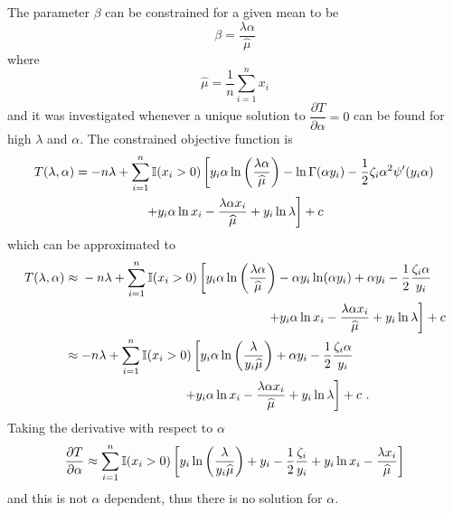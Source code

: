 The parameter $\beta$ can be constrained for a given mean to be
\begin{equation}
  \beta = \frac{\lambda\alpha}{\widehat{\mu}}
  \label{eq:compoundPoisson:beta_restrict}
\end{equation}
where
\begin{equation}
  \widehat{\mu} = \frac{1}{n}\sum_{i=1}^n x_i
\end{equation}
and it was investigated whenever a unique solution to $\dfrac{\partial T}{\partial \alpha} = 0$ can be found for high $\lambda$ and $\alpha$. The constrained objective function is
\begin{multline}
  T(\lambda,\alpha)
  =
  -n\lambda+
  \sum_{i=1}^n
  \mathbb{I}(x_i>0)
  \left[
  y_i\alpha
  \ln\left(\frac{\lambda\alpha}{\widehat{\mu}}\right)-\ln\Gamma(\alpha y_i) - \frac{1}{2}\zeta_i\alpha^2\psi'(y_i\alpha)
  \right.
  \\
  \left.
    +y_i\alpha\ln x_i - \frac{\lambda\alpha x_i}{\widehat{\mu}}
    + y_i \ln \lambda
    \vphantom{\frac{1}{1}}
  \right]
  + c
\end{multline}
which can be approximated to
\begin{align}
  T(\lambda,\alpha)&\approx
  \begin{multlined}[t]
    -n\lambda+
    \sum_{i=1}^n
    \mathbb{I}(x_i>0)
    \left[
      y_i\alpha\ln\left(\frac{\lambda\alpha}{\widehat{\mu}}\right)-\alpha y_i\ln(\alpha y_i) + \alpha y_i - \frac{1}{2}\frac{\zeta_i\alpha}{y_i}
    \right.
    \\
    \left.
      +y_i\alpha\ln x_i - \frac{\lambda\alpha x_i}{\widehat{\mu}}
      + y_i \ln \lambda
      \vphantom{\frac{1}{1}}
    \right]
    + c
  \end{multlined}
  \nonumber\\
  &\!\begin{multlined}[b]\approx
    -n\lambda+
    \sum_{i=1}^n
    \mathbb{I}(x_i>0)
    \left[
      y_i\alpha\ln\left(\frac{\lambda}{y_i\widehat{\mu}}\right) + \alpha y_i - \frac{1}{2}\frac{\zeta_i\alpha}{y_i}
    \right.
    {}\\
    \left.
      +y_i\alpha\ln x_i - \frac{\lambda\alpha x_i}{\widehat{\mu}}
      + y_i \ln \lambda
      \vphantom{\frac{1}{1}}
    \right]
    + c
    \ .
  \end{multlined}
\end{align}
Taking the derivative with respect to $\alpha$
\begin{equation}
  \frac{\partial T}{\partial \alpha} \approx
  \sum_{i=1}^n
  \mathbb{I}(x_i>0)
  \left[
    y_i\ln\left(\frac{\lambda}{y_i\widehat{\mu}}\right)
    + y_i - \frac{1}{2}\frac{\zeta_i}{y_i}
    +y_i\ln x_i - \frac{\lambda x_i}{\widehat{\mu}}
    \vphantom{\frac{1}{1}}
  \right]
\end{equation}
and this is not $\alpha$ dependent, thus there is no solution for $\alpha$.

